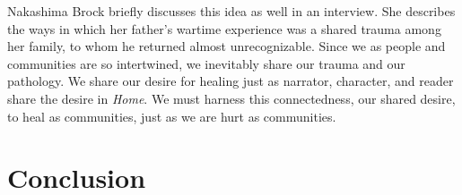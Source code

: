 \documentclass[12pt]{article}
\begin{document}
Nakashima Brock briefly discusses this idea as well in an interview. She
describes the ways in which her father's wartime experience was a shared trauma
among her family, to whom he returned almost
unrecognizable.\autocite{moral-injury} Since we as people and communities are
so intertwined, we inevitably share our trauma and our pathology. We share our
desire for healing just as narrator, character, and reader share the desire in
\emph{Home}. We must harness this connectedness, our shared desire, to heal as
communities, just as we are hurt as communities.



\section{Conclusion}
\end{document}
